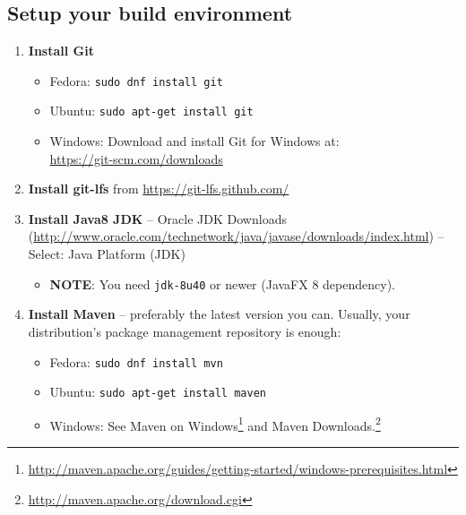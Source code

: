 \subsection*{Setup your build environment}
\begin{enumerate}

\item \textbf{Install Git}

\begin{itemize}

\item Fedora: \texttt{sudo dnf install git}

\item Ubuntu: \texttt{sudo apt-get install git}

\item Windows: Download and install Git for Windows at:\\ \url{https://git-scm.com/downloads}

\end{itemize}

\item \textbf{Install git-lfs} from \url{https://git-lfs.github.com/}

\item \textbf{Install Java8 JDK} -- Oracle JDK Downloads (\url{http://www.oracle.com/technetwork/java/javase/downloads/index.html}) -- Select: Java Platform (JDK)

\begin{itemize}

\item \textbf{NOTE}: You need \texttt{jdk-8u40} or newer (JavaFX 8 dependency).

\end{itemize}

\item \textbf{Install Maven} -- preferably the latest version you can.
Usually, your distribution's package management repository is enough:

\begin{itemize}

\item Fedora: \texttt{sudo dnf install mvn}

\item Ubuntu: \texttt{sudo apt-get install maven}

\item Windows: See
Maven on Windows\footnote{\url{http://maven.apache.org/guides/getting-started/windows-prerequisites.html}} and 
Maven Downloads.\footnote{\url{http://maven.apache.org/download.cgi}}


\end{itemize}
\end{enumerate}
